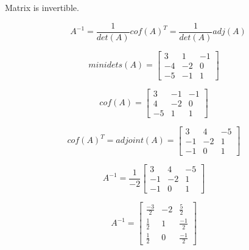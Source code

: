 \documentclass[12pt]{article}
\begin{document}
Matrix is invertible.

$$A^{-1} = \frac{1}{det(A)} cof(A)^T = \frac{1}{det(A)} adj(A)$$

$$
minidets(A) = 
\begin{bmatrix} 
3 & 1 & -1 \\
-4 & -2 & 0 \\
-5 & -1 & 1
\end{bmatrix}
\quad
$$

$$
cof(A) = 
\begin{bmatrix} 
3 & -1 & -1 \\
4 & -2 & 0 \\
-5 & 1 & 1
\end{bmatrix}
\quad
$$



$$
cof(A)^T = adjoint(A) = 
\begin{bmatrix} 
3 & 4 & -5 \\
-1 & -2 & 1 \\
-1 & 0 & 1
\end{bmatrix}
\quad
$$

$$
A^{-1} = 
\frac{1}{-2}
\begin{bmatrix} 
3 & 4 & -5 \\
-1 & -2 & 1 \\
-1 & 0 & 1
\end{bmatrix}
\quad
$$

$$
A^{-1} = 
\begin{bmatrix} 
\frac{-3}{2} & -2 & \frac{5}{2} \\
\frac{1}{2} & 1 & \frac{-1}{2} \\
\frac{1}{2} & 0 & \frac{-1}{2}
\end{bmatrix}
\quad
$$
\end{document}
